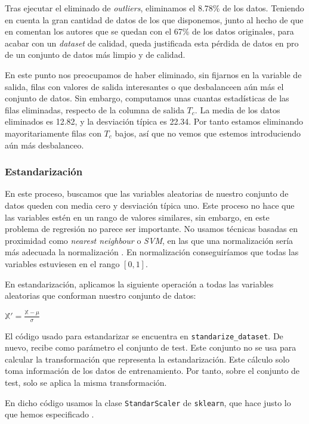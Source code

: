 \documentclass[11pt]{article}
\begin{document}
Tras ejecutar el eliminado de \emph{outliers}, eliminamos el 8.78\% de los datos. Teniendo en cuenta la gran cantidad de datos de los que disponemos, junto al hecho de que en \cite{original_paper_reg:paper} comentan los autores que se quedan con el 67\% de los datos originales, para acabar con un \emph{dataset} de calidad, queda justificada esta pérdida de datos en pro de un conjunto de datos más limpio y de calidad.

En este punto nos preocupamos de haber eliminado, sin fijarnos en la variable de salida, filas con valores de salida interesantes o que desbalanceen aún más el conjunto de datos. Sin embargo, computamos unas cuantas estadísticas de las filas eliminadas, respecto de la columna de salida $T_c$. La media de los datos eliminados es 12.82, y la desviación típica es 22.34. Por tanto estamos eliminando mayoritariamente filas con $T_c$ bajos, así que no vemos que estemos introduciendo aún más desbalanceo.

\subsubsection{Estandarización}

En este proceso, buscamos que las variables aleatorias de nuestro conjunto de datos queden con media cero y desviación típica uno. Este proceso no hace que las variables estén en un rango de valores similares, sin embargo, en este problema de regresión no parece ser importante. No usamos técnicas basadas en proximidad como \emph{nearest neighbour} o \emph{SVM}, en las que una normalización sería más adecuada la normalización \cite{normalization_vs_standarization:online}. En normalización conseguiríamos que todas las variables estuviesen en el rango $[0, 1]$.

En estandarización, aplicamos la siguiente operación a todas las variables aleatorias que conforman nuestro conjunto de datos:

$\mathbb{X'} = \frac{\mathbb{X} - \mu}{\sigma}$

El código usado para estandarizar se encuentra en \lstinline{standarize_dataset}. De nuevo, recibe como parámetro el conjunto de test. Este conjunto no se usa para calcular la transformación que representa la estandarización. Este cálculo solo toma información de los datos de entrenamiento. Por tanto, sobre el conjunto de test, solo se aplica la misma transformación.

En dicho código usamos la clase \lstinline{StandarScaler} de \lstinline{sklearn}, que hace justo lo que hemos especificado \cite{sklearn_std_scaler:online}.
\end{document}
